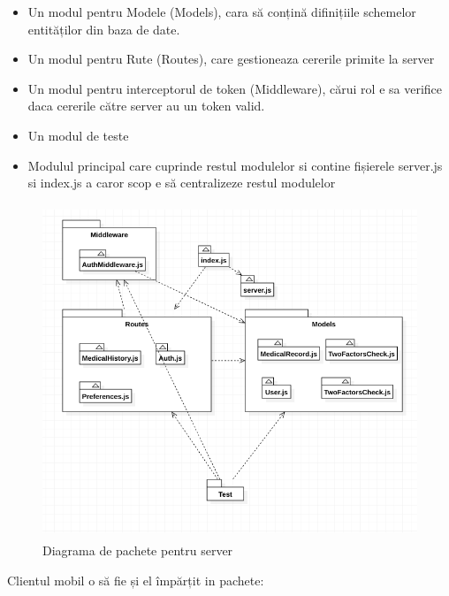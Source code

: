 \documentclass[12pt]{article}
\begin{document}
\begin{itemize}
    \item Un modul pentru Modele (Models), cara să conțină difinițiile schemelor 
    entităților din baza de date.
    \item Un modul pentru Rute (Routes), care gestioneaza cererile primite la server
    \item Un modul pentru interceptorul de token (Middleware), cărui rol e sa
    verifice daca cererile către server au un token valid.
    \item Un modul de teste
    \item Modulul principal care cuprinde restul modulelor si contine fișierele server.js
    si index.js a caror scop e să centralizeze restul modulelor
\end{itemize}

\begin{figure}[H]
    \centering
    \includegraphics[width=12cm, height=10cm]{pacheteserver.png}
    \caption{Diagrama de pachete pentru server}
    \end{figure}

\newpage
Clientul mobil o să fie și el împărțit in pachete:
\end{document}
